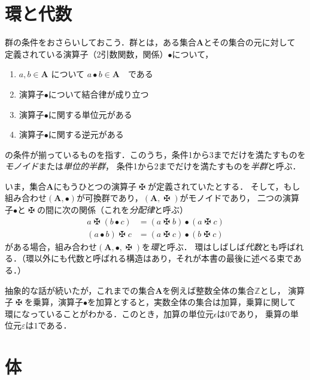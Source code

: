 \documentclass{jsbook}
\newcommand{\keyword}[1]{\emph{#1}}
\newcommand{\bop}[1]{\boldsymbol{#1}}
\newcommand{\bg}[1]{\mathbf{#1}}
\newcommand{\opmaltese}{\mathop{\maltese}}
\begin{document}
\section{環と代数}

群の条件をおさらいしておこう．群とは，ある集合$\bg{A}$とその集合の元に対して
定義されている演算子（2引数関数，関係）$\bullet$について，
\begin{enumerate}
\item $a,b\in\bg{A}$ について $a\bullet b\in\bop{A}$　である
\item 演算子$\bullet$について結合律が成り立つ
\item 演算子$\bullet$に関する単位元がある
\item 演算子$\bullet$に関する逆元がある
\end{enumerate}
の条件が揃っているものを指す．このうち，条件1から3までだけを満たすものを\keyword{モノイド}または\keyword{単位的半群}，
条件1から2までだけを満たすものを\keyword{半群}と呼ぶ．

いま，集合$\bg{A}$にもうひとつの演算子$\opmaltese$が定義されていたとする．
そして，もし組み合わせ$(\bg{A},\bullet)$が可換群であり，$(\bg{A},\opmaltese)$がモノイドであり，
二つの演算子$\bullet$と$\opmaltese$の間に次の関係（これを\keyword{分配律}と呼ぶ）
\begin{align}
a\opmaltese(b\bullet c)&=(a\opmaltese b)\bullet(a\opmaltese c)\\
(a\bullet b)\opmaltese c&=(a\opmaltese c)\bullet(b\opmaltese c)
\end{align}
がある場合，組み合わせ$(\bg{A},\bullet,\opmaltese)$を\keyword{環}と呼ぶ．
環はしばしば\keyword{代数}とも呼ばれる．（環以外にも代数と呼ばれる構造はあり，それが本書の最後に述べる束である．）

抽象的な話が続いたが，これまでの集合$\bg{A}$を例えば整数全体の集合$\mathbb{Z}$とし，
演算子$\opmaltese$を乗算，演算子$\bullet$を加算とすると，実数全体の集合は加算，乗算に関して
環になっていることがわかる．このとき，加算の単位元$\epsilon$は$0$であり，
乗算の単位元$\varepsilon$は$1$である．

\section{体}
\end{document}
